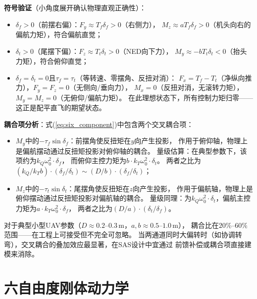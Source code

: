 \documentclass[a4paper,12pt]{ctexart}
\theoremstyle{plain}
\theoremstyle{definition}
\begin{document}
\textbf{符号验证}（小角度展开确认物理直观正确性）：
\begin{itemize}
    \item $\delta_f > 0$（前摆右偏）：$F_y \approx T_f \delta_f > 0$（右侧力），
          $M_z \approx a T_f \delta_f > 0$（机头向右的偏航力矩），符合偏航直觉；
    \item $\delta_t > 0$（尾摆下偏）：$F_z \approx T_t \delta_t > 0$（NED向下力），
          $M_y \approx -b T_t \delta_t < 0$（抬头力矩），符合俯仰直觉；
    \item $\delta_f = \delta_t = 0$且$\tau_f = \tau_t$（等转速、零摆角、反扭对消）：
          $F_x = T_f - T_t$（净纵向推力），$F_y = F_z = 0$（无侧向/垂向力），
          $M_x = 0$（反扭对消，无滚转力矩），$M_y = M_z = 0$（无俯仰/偏航力矩）。
          在此理想状态下，所有控制力矩归零——这正是配平直飞的期望状态。
\end{itemize}

\textbf{耦合项分析}：式(\ref{eq:six_component})中包含两个交叉耦合项：
\begin{itemize}
    \item $M_y$中的$-\tau_f \sin\delta_f$：前摆角使反扭矩在$y$向产生投影，
          作用于俯仰轴，物理上是偏航摆动通过反扭矩投影对俯仰轴的耦合。
          量级估算：在典型参数下，该项约为$k_Q \omega_0^2 \cdot \delta_f$，
          而俯仰主控力矩为$b \cdot k_T \omega_0^2 \cdot \delta_t$。
          两者之比为$(k_Q / k_T b) \cdot (\delta_f/\delta_t) \sim (D/b) \cdot (\delta_f/\delta_t)$；
    \item $M_z$中的$-\tau_t \sin\delta_t$：尾摆角使反扭矩在$z$向产生投影，
          作用于偏航轴，物理上是俯仰摆动通过反扭矩投影对偏航轴的耦合。
          量级同理：为$k_Q \omega_0^2 \cdot \delta_t$，偏航主控力矩为$a \cdot k_T \omega_0^2 \cdot \delta_f$，
          两者之比为$(D/a) \cdot (\delta_t/\delta_f)$。
\end{itemize}

对于典型小型UAV参数（$D \approx 0.2$--$0.3$\,m，$a, b \approx 0.5$--$1.0$\,m），
耦合比在$20\%$--$60\%$范围——在工程上可接受但不完全可忽略。
当两通道同时大偏转时（如协调转弯），交叉耦合的叠加效应最显著，在SAS设计中宜通过
前馈补偿或耦合项直接建模来消除。

\section{六自由度刚体动力学}
\label{sec:dynamics}
\end{document}
